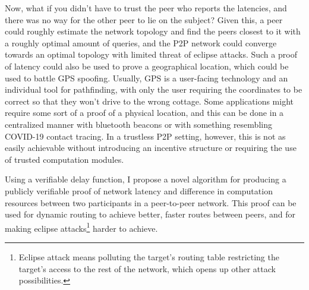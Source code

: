 Now, what if you didn't have to trust the peer who reports the latencies, and there was no way for the other peer to lie on the subject? Given this, a peer could roughly estimate the network topology and find the peers closest to it with a roughly optimal amount of queries, and the P2P network could converge towards an optimal topology with limited threat of eclipse attacks. Such a proof of latency could also be used to prove a geographical location, which could be used to battle GPS spoofing. Usually, GPS is a user-facing technology and an individual tool for pathfinding, with only the user requiring the coordinates to be correct so that they won't drive to the wrong cottage. Some applications might require some sort of a proof of a physical location, and this can be done in a centralized manner with bluetooth beacons or with something resembling COVID-19 contact tracing. In a trustless P2P setting, however, this is not as easily achievable without introducing an incentive structure or requiring the use of trusted computation modules.  


Using a verifiable delay function, I propose a novel algorithm for producing a publicly verifiable proof of network latency and difference in computation resources between two participants in a peer-to-peer network. This proof can be used for dynamic routing to achieve better, faster routes between peers, and for making eclipse attacks\footnote{Eclipse attack means polluting the target's routing table restricting the target's access to the rest of the network, which opens up other attack possibilities.} harder to achieve. 
